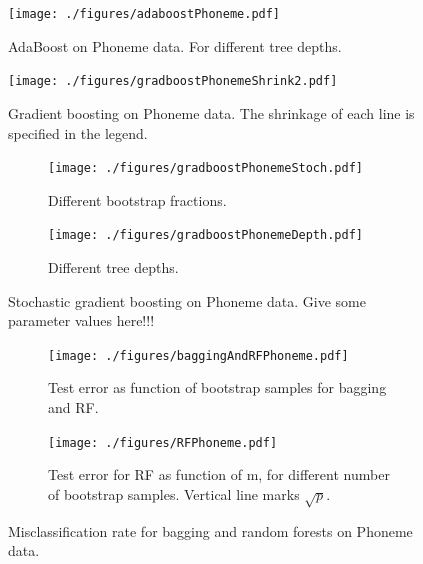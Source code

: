 \begin{figure}[h!]
\begin{center}
    \texttt{[image: ./figures/adaboostPhoneme.pdf]}
\end{center}
\caption{AdaBoost on Phoneme data. For different tree depths.}
\label{fig:adaboostPhoneme}
\end{figure}

\begin{figure}[h!]
\begin{center}
    \texttt{[image: ./figures/gradboostPhonemeShrink2.pdf]}
\end{center}
\caption{Gradient boosting on Phoneme data. The shrinkage of each line is specified in the legend.}
\label{fig:gradboostPhonemeShrink2}
\end{figure}

\begin{figure}[h!]
  \centering
  \begin{subfigure}[b]{0.48\textwidth}
    \texttt{[image: ./figures/gradboostPhonemeStoch.pdf]}
    \caption{Different bootstrap fractions.}
    \label{fig:gradboostPhonemeStoch}
  \end{subfigure}%
  \quad
  \begin{subfigure}[b]{0.48\textwidth}
    \texttt{[image: ./figures/gradboostPhonemeDepth.pdf]}
    \caption{Different tree depths.}
    \label{fig:gradboostPhonemeDepth}
  \end{subfigure}
  \vspace{1\baselineskip}
  \caption{Stochastic gradient boosting on Phoneme data. Give some parameter values here!!!}
  \label{fig:StochasticGradBoostPhoneme}
\end{figure}

\begin{figure}[h!]
  \centering
  \begin{subfigure}[b]{0.48\textwidth}
    \texttt{[image: ./figures/baggingAndRFPhoneme.pdf]}
    \caption{Test error as function of bootstrap samples for bagging and RF.}
    \label{fig:baggingAndRFPhoneme}
  \end{subfigure}%
  \quad
  \begin{subfigure}[b]{0.48\textwidth}
    \texttt{[image: ./figures/RFPhoneme.pdf]}
    \caption{Test error for RF as function of m, for different number of bootstrap samples. Vertical line marks $\sqrt{p}$.}
    \label{fig:RFPhoneme}
  \end{subfigure}
  \vspace{1\baselineskip}
  \caption{Misclassification rate for bagging and random forests on Phoneme data.}
  \label{fig:baggAndRFPhoneme}
\end{figure}


